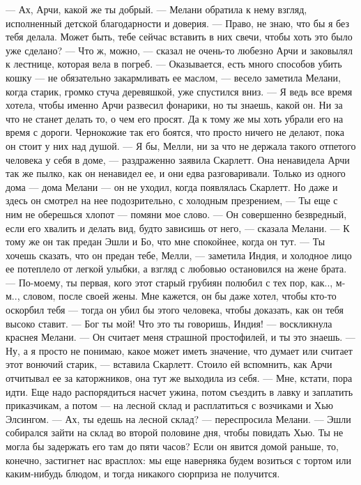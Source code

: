 — Ах, Арчи, какой же ты добрый. — Мелани обратила к нему взгляд, исполненный детской благодарности и доверия. — Право, не знаю, что бы я без тебя делала. Может быть, тебе сейчас вставить в них свечи, чтобы хоть это было уже сделано?
— Что ж, можно, — сказал не очень-то любезно Арчи и заковылял к лестнице, которая вела в погреб.
— Оказывается, есть много способов убить кошку — не обязательно закармливать ее маслом, — весело заметила Мелани, когда старик, громко стуча деревяшкой, уже спустился вниз. — Я ведь все время хотела, чтобы именно Арчи развесил фонарики, но ты знаешь, какой он. Ни за что не станет делать то, о чем его просят. Да к тому же мы хоть убрали его на время с дороги. Чернокожие так его боятся, что просто ничего не делают, пока он стоит у них над душой.
— Я бы, Мелли, ни за что не держала такого отпетого человека у себя в доме, — раздраженно заявила Скарлетт. Она ненавидела Арчи так же пылко, как он ненавидел ее, и они едва разговаривали. Только из одного дома — дома Мелани — он не уходил, когда появлялась Скарлетт. Но даже и здесь он смотрел на нее подозрительно, с холодным презрением, — Ты еще с ним не оберешься хлопот — помяни мое слово.
— Он совершенно безвредный, если его хвалить и делать вид, будто зависишь от него, — сказала Мелани. — К тому же он так предан Эшли и Бо, что мне спокойнее, когда он тут.
— Ты хочешь сказать, что он предан тебе, Мелли, — заметила Индия, и холодное лицо ее потеплело от легкой улыбки, а взгляд с любовью остановился на жене брата. — По-моему, ты первая, кого этот старый грубиян полюбил с тех пор, как.., м-м.., словом, после своей жены. Мне кажется, он бы даже хотел, чтобы кто-то оскорбил тебя — тогда он убил бы этого человека, чтобы доказать, как он тебя высоко ставит.
— Бог ты мой! Что это ты говоришь, Индия! — воскликнула краснея Мелани. — Он считает меня страшной простофилей, и ты это знаешь.
— Ну, а я просто не понимаю, какое может иметь значение, что думает или считает этот вонючий старик, — вставила Скарлетт. Стоило ей вспомнить, как Арчи отчитывал ее за каторжников, она тут же выходила из себя. — Мне, кстати, пора идти. Еще надо распорядиться насчет ужина, потом съездить в лавку и заплатить приказчикам, а потом — на лесной склад и расплатиться с возчиками и Хью Элсингом.
— Ах, ты едешь на лесной склад? — переспросила Мелани. — Эшли собирался зайти на склад во второй половине дня, чтобы повидать Хью. Ты не могла бы задержать его там до пяти часов? Если он явится домой раньше, то, конечно, застигнет нас врасплох: мы еще наверняка будем возиться с тортом или каким-нибудь блюдом, и тогда никакого сюрприза не получится.
